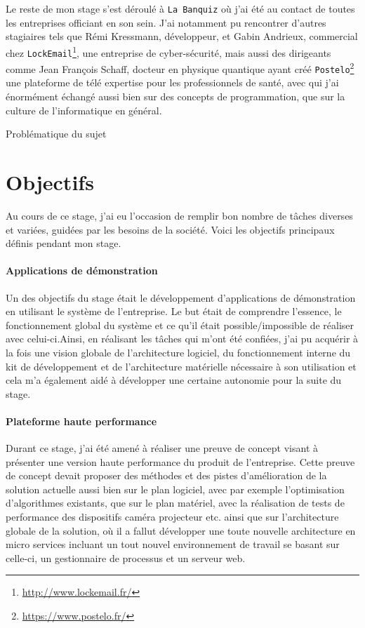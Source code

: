 Le reste de mon stage s'est déroulé à \texttt{La Banquiz} où j'ai été au contact de toutes les entreprises officiant en son sein. J'ai notamment pu rencontrer d'autres stagiaires tels que Rémi Kressmann, développeur, et Gabin Andrieux, commercial chez \texttt{LockEmail}\footnote{\href{http://www.lockemail.fr/}{http://www.lockemail.fr/}}, une entreprise de cyber-sécurité, mais aussi des dirigeants comme Jean François Schaff, docteur en physique quantique ayant créé  \texttt{Postelo}\footnote{\href{https://www.postelo.fr/}{https://www.postelo.fr/}} une plateforme de télé expertise pour les professionnels de santé, avec qui j'ai énormément échangé aussi bien sur des concepts de programmation, que sur la culture de l'informatique en général.

\begin{center}
Problématique du sujet
\end{center}

\section{Objectifs}

Au cours de ce stage, j'ai eu l'occasion de remplir bon nombre de tâches diverses et variées, guidées par les besoins de la société. Voici les objectifs principaux définis pendant mon stage.

\paragraph{Applications de démonstration} Un des objectifs du stage était le développement d'applications de démonstration en utilisant le système de l'entreprise. Le but était de comprendre l'essence, le fonctionnement global du système et ce qu'il était possible/impossible de réaliser avec celui-ci.Ainsi, en réalisant les tâches qui m'ont été confiées, j'ai pu acquérir à la fois une vision globale de l'architecture logiciel, du fonctionnement interne du kit de développement et de l'architecture matérielle nécessaire à son utilisation et cela m'a également aidé à développer une certaine autonomie pour la suite du stage.

\paragraph{Plateforme haute performance} Durant ce stage, j'ai été amené à réaliser une preuve de concept visant à présenter une version haute performance du produit de l'entreprise. Cette preuve de concept devait proposer des méthodes et des pistes d'amélioration de la solution actuelle aussi bien sur le plan logiciel, avec par exemple l'optimisation d'algorithmes existants, que sur le plan matériel, avec la réalisation de tests de performance des dispositifs caméra projecteur etc. ainsi que sur l'architecture globale de la solution, où il a fallut développer une toute nouvelle architecture en micro services incluant un tout nouvel environnement de travail se basant sur celle-ci, un gestionnaire de processus et un serveur web.

